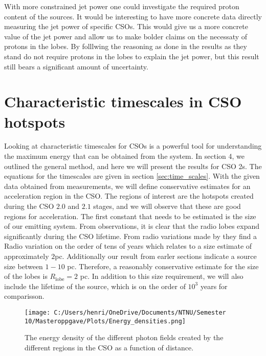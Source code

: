 With more constrained jet power one could investigate the required proton content of the sources. It would be interesting to have more concrete data directly measuring the jet power of specific CSOs. This would give us a more concrete value of the jet power and allow us to make bolder claims on the necessaty of protons in the lobes.
By folllwing the reasoning as done in \cite{Wykes_2013} the results as they stand do not require protons in the lobes to explain the jet power, but this result still bears a significant amount of uncertainty.  




\section{Characteristic timescales in CSO hotspots}

Looking at characteristic timescales for CSOs is a powerful tool for understanding the maximum energy that can be obtained from the system. In section 4, we outlined the general method, and here we will present the results for CSO 2s. The equations for the timescales are given in section \ref{sec:time_scales}.
With the given data obtained from measurements, we will define conservative estimates for an acceleration region in the CSO. The regions of interest are the hotspots created during the CSO $2.0$ and $2.1$ stages, and we will observe that these are good regions for acceleration. The first constant that needs to be estimated is the size of our emitting system. From observations, it is clear that the radio lobes expand significantly during the CSO lifetime. From radio variations made by \cite{bronzini2024investigating} they find a Radio variation on the order of tens of years which relates to a size estimate of approximately $2$pc. Additionally our result from earler sections indicate a source size between $1-10$ pc. Therefore,  a reasonably conservative estimate for the size of the lobes is $R_{\text{lobe}} = 2$ pc. In addition to this size requirement, we will also include the lifetime of the source, which is on the order of $10^3$ years for comparisson.

\begin{figure}
    \centering
    \texttt{[image: C:/Users/henri/OneDrive/Documents/NTNU/Semester 10/Masteroppgave/Plots/Energy\_densities.png]}
    \caption{The energy density of the different photon fields created by the different regions in the CSO as a function of distance.}
    \label{fig:energy_densities}
\end{figure}

